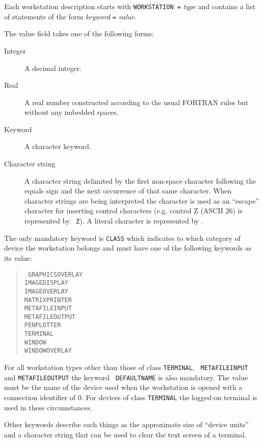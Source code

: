 \documentclass[twoside,11pt]{article}
\renewcommand{\_}{\texttt{\symbol{95}}}
\begin{document}
Each workstation description starts with {\tt WORKSTATION =} {\em type} and
contains a list of statements of the form {\em keyword} {\tt =} {\em value}.

The value field takes one of the following forms:
\begin{description}
\item[Integer] A decimal integer.
\item[Real] A real number constructed according to the usual FORTRAN rules but
without any imbedded spaces.
\item[Keyword] A character keyword.
\item[Character string] A character string delimited by the first non-space
character following the equals sign and the next occurrence of that same
character.
When character strings are being interpreted the {\tt{}} character is used
as an ``escape'' character for inserting control characters (e.g. control Z
(ASCII 26) is represented by {\tt{} Z}). A literal {\tt{}} character
is represented by {\tt{}}.
\end{description}

The only mandatory keyword is {\tt CLASS} which indicates to which category of
device the workstation belongs and must have one of the following
keywords as its value:

\begin{quote}{\tt
GRAPHICS\_OVERLAY\\
IMAGE\_DISPLAY\\
IMAGE\_OVERLAY \\
MATRIX\_PRINTER\\
METAFILE\_INPUT\\
METAFILE\_OUTPUT\\
PEN\_PLOTTER\\
TERMINAL\\
WINDOW\\
WINDOW\_OVERLAY}
\end{quote}

For all workstation types other than those of class {\tt TERMINAL}, {\tt
METAFILE\_\-INPUT} and {\tt METAFILE\_\-OUTPUT} the keyword {\tt
DEFAULT\_NAME} is also mandatory. The value must be the name of the
device used when the workstation is opened with a connection identifier of
0. For devices of class {\tt TERMINAL} the logged-on terminal is used in
these circumstances.

Other keywords describe such things as the
approximate size of ``device units'' and a character string that can be
used to clear the text screen of a terminal.
\end{document}

